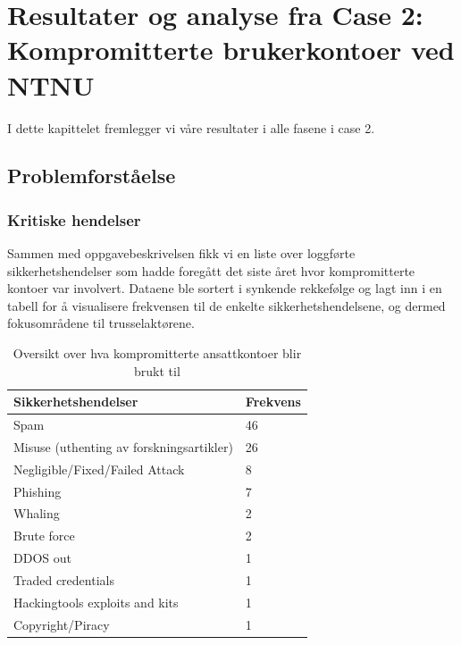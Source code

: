 \chapter{Resultater og analyse fra Case 2: Kompromitterte brukerkontoer ved NTNU}
I dette kapittelet fremlegger vi våre resultater i alle fasene i case 2.

\section{Problemforståelse}

\subsection{Kritiske hendelser}
Sammen med oppgavebeskrivelsen fikk vi en liste over loggførte sikkerhetshendelser som hadde foregått det siste året hvor kompromitterte kontoer var involvert. Dataene ble sortert i synkende rekkefølge og lagt inn i en tabell for å visualisere frekvensen til de enkelte sikkerhetshendelsene, og dermed fokusområdene til trusselaktørene. 

\begin{table} [H]
    \begin{tabular}{ | m{18em} | m{18em} | }
        \hline
            \cellcolor{yellow} Sikkerhetshendelser & \cellcolor{yellow} Frekvens \\
        \hline
            Spam & 46  \\
        \hline
            Misuse (uthenting av forskningsartikler) & 26 \\
        \hline
            Negligible/Fixed/Failed Attack  & 8 \\
        \hline
            Phishing & 7 \\
        \hline
            Whaling & 2 \\
        \hline
            Brute force & 2 \\
        \hline
            DDOS out & 1 \\
        \hline
            Traded credentials & 1 \\
        \hline
            Hackingtools exploits and kits & 1 \\
        \hline
            Copyright/Piracy & 1 \\
        \hline
    \end{tabular}
    \caption{Oversikt over hva kompromitterte ansattkontoer blir brukt til}
    \label{kritisk_tabell_2}
\end{table}

